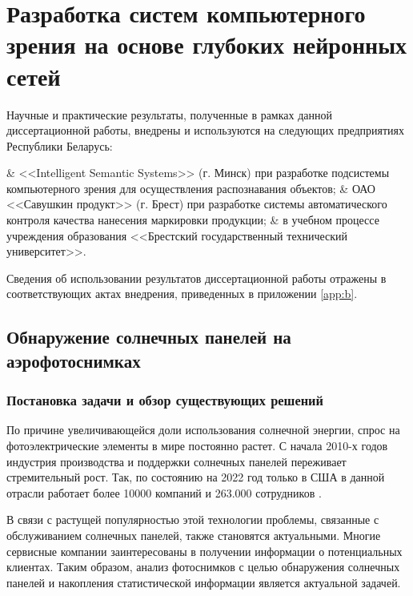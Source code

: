 \chapter{Разработка систем компьютерного зрения на основе глубоких нейронных сетей}

Научные и практические результаты, полученные в рамках данной диссертационной работы, внедрены и используются на следующих предприятиях Республики Беларусь:

\begin{easylist}
	& <<Intelligent Semantic Systems>> (г. Минск) при разработке подсистемы компьютерного зрения для осуществления распознавания объектов;
	& ОАО <<Савушкин продукт>> (г. Брест) при разработке системы автоматического контроля качества нанесения маркировки продукции;
	& в учебном процессе учреждения образования <<Брестский государственный технический университет>>.
 \end{easylist}

Сведения об использовании результатов диссертационной работы отражены в соответствующих актах внедрения, приведенных в приложении \ref{app:b}.

\section{Обнаружение солнечных панелей на аэрофотоснимках}

\subsection{Постановка задачи и обзор существующих решений}
По причине увеличивающейся доли использования солнечной энергии, спрос на фотоэлектрические элементы в мире постоянно растет. С начала 2010-х годов индустрия производства и поддержки солнечных панелей переживает стремительный рост. Так, по состоянию на 2022 год только в США в данной отрасли работает более 10000 компаний и 263.000 сотрудников \cite{seia}.

В связи с растущей популярностью этой технологии проблемы, связанные с обслуживанием солнечных панелей, также становятся актуальными. Многие сервисные компании заинтересованы в получении информации о потенциальных клиентах. Таким образом, анализ фотоснимков с целью обнаружения солнечных панелей и накопления статистической информации является актуальной задачей.


